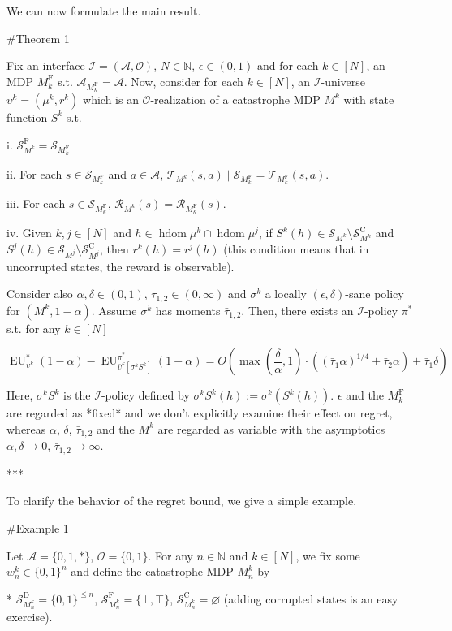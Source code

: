 \documentclass[a4paper]{article}
\newcommand{\Bool}{\{0,1\}}
\newcommand{\AP}[1]{\left(#1\right)}
\newcommand{\AB}[1]{\left[#1\right]}
\newcommand{\Nats}{\mathbb{N}}
\newcommand{\Ob}{\mathcal{O}}
\newcommand{\A}{\mathcal{A}}
\newcommand{\St}{\mathcal{S}}
\newcommand{\T}{\mathcal{T}}
\newcommand{\R}{\mathcal{R}}
\newcommand{\In}{\mathcal{I}}
\newcommand{\Adi}{{\bar{\In}}}
\DeclareMathOperator{\HD}{hdom}
\newcommand{\RMC}{\mathrm{C}}
\newcommand{\RMD}{\mathrm{D}}
\newcommand{\RMF}{\mathrm{F}}
\newcommand{\SF}{\St^{\RMF}}
\newcommand{\SD}{\St^{\RMD}}
\newcommand{\SC}{\St^{\RMC}}
\newcommand{\MF}{M^{\RMF}}
\newcommand{\EU}{\operatorname{EU}}
\begin{document}
We can now formulate the main result.

\#Theorem 1

Fix an interface $\In=(\A,\Ob)$, $N \in \Nats$, $\epsilon \in (0,1)$ and for each $k \in [N]$, an MDP $\MF_k$ s.t. $\A_{\MF_k} = \A$. Now, consider for each $k \in [N]$, an $\In$-universe $\upsilon^k=(\mu^k,r^k)$ which is an $\Ob$-realization of a catastrophe MDP $M^k$ with state function $S^k$ s.t.

i. $\SF_{M^k} = \St_{\MF_k}$

ii. For each $s \in \St_{\MF_k}$ and $a \in \A$, $\T_{M^k}(s,a) \mid \St_{\MF_k} = \T_{\MF_k}(s,a)$.

iii. For each $s \in \St_{\MF_k}$, $\R_{M^k}(s)=\R_{\MF_k}(s)$.

iv. Given $k,j \in [N]$ and $h \in \HD{\mu^k} \cap \HD{\mu^j}$, if $S^k(h) \in \St_{M^k} \setminus \SC_{M^k}$ and $S^j(h) \in \St_{M^j} \setminus \SC_{M^j}$, then $r^k(h)=r^j(h)$ (this condition means that in uncorrupted states, the reward is observable).

Consider also $\alpha,\delta\in(0,1)$, $\bar{\tau}_{1,2} \in (0,\infty)$ and $\sigma^k$ a locally $(\epsilon,\delta)$-sane policy for $(M^k,1-\alpha)$. Assume $\sigma^k$ has moments $\bar{\tau}_{1,2}$. Then, there exists an $\Adi$-policy $\pi^*$ s.t. for any $k \in [N]$

$$\EU_{\upsilon^k}^*(1-\alpha) - \EU_{\bar{\upsilon}^k\AB{\sigma^kS^k}}^{\pi^*}(1-\alpha) = O\AP{\max\AP{\frac{\delta}{\alpha},1}\cdot\AP{(\bar{\tau}_1 \alpha)^{1/4} + \bar{\tau}_2 \alpha}+\bar{\tau}_1\delta}$$

Here, $\sigma^k S^k$ is the $\In$-policy defined by $\sigma^k S^k(h):=\sigma^k\AP{S^k(h)}$. $\epsilon$ and the $\MF_k$ are regarded as *fixed* and we don't explicitly examine their effect on regret, whereas $\alpha$, $\delta$, $\bar{\tau}_{1,2}$ and the $M^k$ are regarded as variable with the asymptotics $\alpha,\delta \rightarrow 0$, $\bar{\tau}_{1,2} \rightarrow \infty$.

***

To clarify the behavior of the regret bound, we give a simple example.

\#Example 1

Let $\A = \{0,1,*\}$, $\Ob=\Bool$. For any $n \in \Nats$ and $k \in [N]$, we fix some $w_n^k \in \Bool^n$ and define the catastrophe MDP $M_n^k$ by

* $\SD_{M_n^k} = \Bool^{\leq n}$, $\SF_{M_n^k} = \{\bot,\top\}$, $\SC_{M_n^k} = \varnothing$ (adding corrupted states is an easy exercise).
\end{document}

